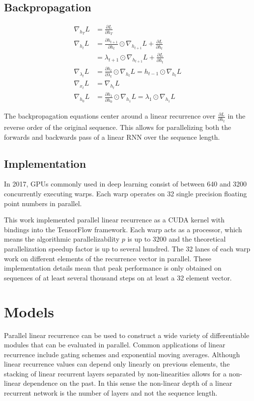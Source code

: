 \documentclass{article}
\begin{document}
\subsection{Backpropagation}
\begin{align*}
\nabla_{h_T}L &= \frac{\partial L}{\partial h_T} \\
\nabla_{h_t}L &= \frac{\partial h_{t+1}}{\partial h_t} \odot \nabla_{h_{t+1}} L + \frac{\partial L}{\partial h_t} \\ 
&= \lambda_{t+1} \odot \nabla_{h_{t+1}} L + \frac{\partial L}{\partial h_t} \\
\nabla_{\lambda_t}L &= \frac{\partial h_t}{\partial\lambda_t} \odot \nabla_{h_t}L = h_{t-1} \odot \nabla_{h_t}L \\
\nabla_{x_t}L &= \nabla_{h_t} L \\
\nabla_{h_0}L &=  \frac{\partial h_1}{\partial h_0} \odot \nabla_{h_1} L = \lambda_1 \odot \nabla_{h_1} L
\end{align*}

The backpropagation equations center around a linear recurrence over $\frac{\partial L}{\partial h_t}$ in the reverse order of the original sequence. This allows for parallelizing both the forwards and backwards pass of a linear RNN over the sequence length.

\subsection{Implementation}
In 2017, GPUs commonly used in deep learning consist of between 640 and 3200
concurrently executing warps. Each warp operates on 32 single precision floating
point numbers in parallel.

This work implemented parallel linear recurrence as a CUDA kernel with bindings
into the TensorFlow \cite{abadi2016tensorflow} framework. Each warp acts as a
processor, which means the algorithmic parallelizability $p$ is up to 3200 and the theoretical
parallelization speedup factor is up to several hundred.  The 32 lanes of each
warp work on different elements of the recurrence vector in parallel. These
implementation details mean that peak performance is only obtained on sequences
of at least several thousand steps on at least a 32 element vector.

\section{Models}
Parallel linear recurrence can be used to construct a wide variety of differentiable modules that can be evaluated in parallel. Common applications of linear recurrence include gating schemes and exponential moving averages. Although linear recurrence values can depend only linearly on previous elements, the stacking of linear recurrent layers separated by non-linearities allows for a non-linear dependence on the past. In this sense the non-linear depth of a linear recurrent network is the number of layers and not the sequence length. 
\end{document}
